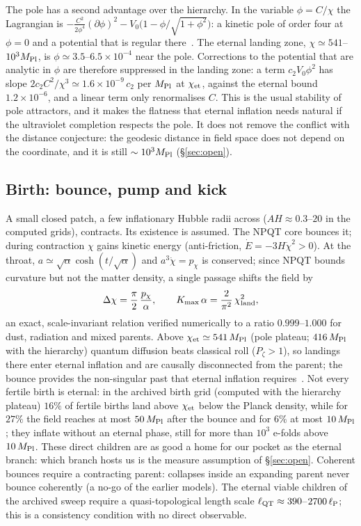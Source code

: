 \documentclass[11pt,a4paper]{article}
\newcommand{\Mpl}{M_{\rm Pl}}
\begin{document}
The pole has a second advantage over the hierarchy.
In the variable $\phi=C/\chi$ the Lagrangian is $-\tfrac{C^2}{2\phi^4}(\partial\phi)^2-V_0\big(1-\phi/\sqrt{1+\phi^2}\big)$: a kinetic pole of order four at $\phi=0$ and a potential that is regular there~\cite{GKLR2015}.
The eternal landing zone, $\chi\simeq541$--$10^3\Mpl$, is $\phi\simeq3.5$--$6.5\times10^{-4}$ near the pole.
Corrections to the potential that are analytic in $\phi$ are therefore suppressed in the landing zone: a term $c_2V_0\phi^2$ has slope $2c_2C^2/\chi^3\simeq1.6\times10^{-9}\,c_2$ per $\Mpl$ at $\chi_{\rm et}$, against the eternal bound $1.2\times10^{-6}$, and a linear term only renormalises $C$.
This is the usual stability of pole attractors, and it makes the flatness that eternal inflation needs natural if the ultraviolet completion respects the pole.
It does not remove the conflict with the distance conjecture: the geodesic distance in field space does not depend on the coordinate, and it is still $\sim10^3\Mpl$ (\S\ref{sec:open}).

\subsection{Birth: bounce, pump and kick}
\label{sec:birth}

A small closed patch, a few inflationary Hubble radii across ($AH\approx0.3$--$20$ in the computed grids), contracts.
Its existence is assumed.
The NPQT core bounces it; during contraction $\chi$ gains kinetic energy (anti-friction, $\dot E = -3H\dot\chi^2 > 0$).
At the throat, $a\simeq\sqrt{\alpha}\cosh(t/\sqrt{\alpha})$ and $a^3\dot\chi = p_\chi$ is conserved; since NPQT bounds curvature but not the matter density, a single passage shifts the field by
\begin{equation}
\Delta\chi = \frac{\pi}{2}\,\frac{p_\chi}{\alpha},\qquad K_{\max}\,\alpha = \frac{2}{\pi^2}\,\chi_{\rm land}^2,
\label{eq:kick}
\end{equation}
an exact, scale-invariant relation verified numerically to a ratio $0.999$--$1.000$ for dust, radiation and mixed parents.
Above $\chi_{\rm et}\simeq 541\,\Mpl$ (pole plateau; $416\,\Mpl$ with the hierarchy) quantum diffusion beats classical roll ($P_\zeta>1$), so landings there enter eternal inflation and are causally disconnected from the parent; the bounce provides the non-singular past that eternal inflation requires~\cite{BGV2003}.
Not every fertile birth is eternal: in the archived birth grid (computed with the hierarchy plateau) $16\%$ of fertile births land above $\chi_{\rm et}$ below the Planck density, while for $27\%$ the field reaches at most $50\,\Mpl$ after the bounce and for $6\%$ at most $10\,\Mpl$; they inflate without an eternal phase, still for more than $10^3$ e-folds above $10\,\Mpl$. These direct children are as good a home for our pocket as the eternal branch: which branch hosts us is the measure assumption of \S\ref{sec:open}.
Coherent bounces require a contracting parent: collapses inside an expanding parent never bounce coherently (a no-go of the earlier models).
The eternal viable children of the archived sweep require a quasi-topological length scale $\ell_{\rm QT}\approx 390$--$2700\,\ell_{\rm P}$; this is a consistency condition with no direct observable.
\end{document}

